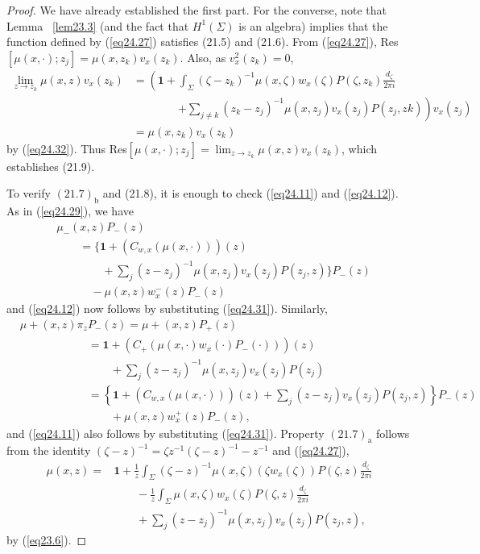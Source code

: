 \documentclass{surv-l}
\theoremstyle{plain}
\theoremstyle{definition}
\numberwithin{equation}{chapter}
\begin{document}
\begin{proof}
We have already established the first part. For the converse, note that Lemma ~\ref{lem23.3} (and the fact that $H^{1}(\Sigma)$ is an algebra) implies that the function defined by (\ref{eq24.27}) satisfies (21.5) and (21.6). From (\ref{eq24.27}), Res$[\mu(x,\cdot);z_{j}]= \mu(x, z_{k})v_{x}(z_{k})$. Also, as $v_{x}^{2}(z_{k})=0$,
\begin{align*}
\lim_{z\rightarrow z_{k}}\mu(x, z)v_{x}(z_{k}) & = \left(\mathbf{1}+\int_{\Sigma}(\zeta-z_{k})^{-1}\mu(x, \zeta)w_{x}(\zeta)P(\zeta, z_{k})\frac{d_{\zeta}}{2\pi i}\right.\\
&\qquad \qquad \left. +\sum_{j\neq k}(z_{k}-z_{j})^{-1}\mu(x,z_{j})v_{x}(z_{j})P(z_{j},z{k})\right)v_{x}(z_{j})\\
& =\mu(x,z_{k})v_{x}(z_{k})
\end{align*}
by (\ref{eq24.32}). Thus Res$[\mu(x, \cdot);z_{j}]=\lim_{z\rightarrow z_{k}}\mu(x,z)v_{x}(z_{k})$, which establishes (21.9).

To verify $(21.7)_{\mathrm{b}}$ and (21.8), it is enough to check (\ref{eq24.11}) and (\ref{eq24.12}). As in (\ref{eq24.29}), we have
\begin{align*}
& \mu_{-}(x,z)P_{-}(z)\\
&\qquad =\Big\{\mathbf{1}+(C_{w,x}(\mu(x,\cdot)))(z)\\
&\qquad \qquad   +\sum_{j}(z-z_{j})^{-1}\mu(x,z_{j})v_{x}(z_{j})P(z_{j},z) \Big\} P_{-}(z)\\
&\qquad \quad  -\mu(x, z)w_{x}^{-}(z)P_{-}(z)
\end{align*}
and (\ref{eq24.12}) now follows by substituting (\ref{eq24.31}). Similarly,
\begin{align*}
&\mu+(x, z)\pi_{z}P_{-}(z) =\mu+(x,z)P_{+}(z)\\
&\qquad\qquad\qquad =\mathbf{1}+(C_{+}(\mu(x, \cdot)w_{x}(\cdot)P_{-}(\cdot)))(z)\\
&\qquad\qquad\qquad\qquad +\sum_{j}(z-z_{j})^{-1}\mu(x, z_{j})v_{x}(z_{j})P(z_{j})\\
&\qquad\qquad\qquad =\left\{\mathbf{1}+(C_{w,x}(\mu(x, \cdot)))(z)+\sum_{j}(z-z_{j})v_{x}(z_{j})P(z_{j}, z)\right\}P_{-}(z)\\
&\qquad\qquad\qquad\qquad +\mu(x,z)w_{x}^{+}(z)P_{-}(z),
\end{align*}
and (\ref{eq24.11}) also follows by substituting (\ref{eq24.31}).
Property $(21.7)_{\mathrm{a}}$ follows from the identity $(\zeta-z)^{-1}=\zeta
z^{-1}(\zeta-z)^{-1}-z^{-1}$ and (\ref{eq24.27}),
\begin{align*}
\mu(x, z) =&\mathbf{1}+\frac{1}{z}\int_{\Sigma}(\zeta-z)^{-1}\mu(x, \zeta)(\zeta w_{x}(\zeta))P(\zeta, z)\frac{d_{\zeta}}{2\pi i}\\
&\qquad  -\frac{1}{z}\int_{\Sigma}\mu(x,\zeta)w_{x}(\zeta)P(\zeta,z)\frac{d_{\zeta}}{2\pi i}\\
&\qquad  +\sum_{j}(z-z_{j})^{-1}\mu(x, z_{j})v_{x}(z_{j})P(z_{j}, z),
\end{align*}
by (\ref{eq23.6}).


\end{proof}
\end{document}
